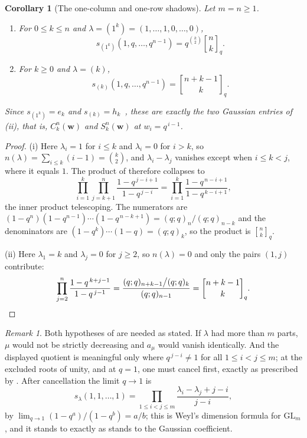 \documentclass[11pt,oneside,openany]{book}
\newtheorem{corollary}[corollary]{Corollary}
\theoremstyle{definition}
\theoremstyle{remark}
\newtheorem{remark}[remark]{Remark}
\newcommand{\qbinom}[2]{\genfrac{[}{]}{0pt}{}{#1}{#2}_{q}}
\begin{document}
\begin{corollary}[The one-column and one-row shadows]\label{cor:schur-e-h}
Let $m=n\ge1$.
\begin{enumerate}[label=\textup{(\roman*)}]
\item For $0\le k\le n$ and $\lambda=(1^k)=(1,\ldots,1,0,\ldots,0)$,
\[
 s_{(1^k)}(1,q,\ldots,q^{n-1})=q^{\binom k2}\qbinom nk.
\]
\item For $k\ge0$ and $\lambda=(k)$,
\[
 s_{(k)}(1,q,\ldots,q^{n-1})=\qbinom{n+k-1}{k}.
\]
\end{enumerate}
Since $s_{(1^k)}=e_k$ and $s_{(k)}=h_k$~\cite{Macdonald1995}, these are
exactly the two Gaussian entries of (ii),
that is, $C_k^n(\mathbf w)$ and $S_k^n(\mathbf w)$ at $w_i=q^{\,i-1}$.
\end{corollary}

\begin{proof}
(i) Here $\lambda_i=1$ for $i\le k$ and $\lambda_i=0$ for $i>k$, so
$n(\lambda)=\sum_{i\le k}(i-1)=\binom k2$, and $\lambda_i-\lambda_j$ vanishes
except when $i\le k<j$, where it equals $1$.  The product of
 therefore collapses to
\[
 \prod_{i=1}^{k}\prod_{j=k+1}^{n}
 \frac{1-q^{\,j-i+1}}{1-q^{\,j-i}}
 =\prod_{i=1}^{k}\frac{1-q^{\,n-i+1}}{1-q^{\,k-i+1}},
\]
the inner product telescoping.  The numerators are
$(1-q^{n})(1-q^{n-1})\cdots(1-q^{\,n-k+1})=(q;q)_n/(q;q)_{n-k}$ and the
denominators are $(1-q^k)\cdots(1-q)=(q;q)_k$, so the product is $\qbinom nk$.

(ii) Here $\lambda_1=k$ and $\lambda_j=0$ for $j\ge2$, so $n(\lambda)=0$ and
only the pairs $(1,j)$ contribute:
\[
 \prod_{j=2}^{n}\frac{1-q^{\,k+j-1}}{1-q^{\,j-1}}
 =\frac{(q;q)_{n+k-1}\big/(q;q)_k}{(q;q)_{n-1}}
 =\qbinom{n+k-1}{k}.
 \qedhere
\]
\end{proof}

\begin{remark}\label{rem:schur-hypotheses}
Both hypotheses of  are needed as stated.  If
$\lambda$ had more than $m$ parts, $\mu$ would not be strictly decreasing and
$a_\mu$ would vanish identically.  And the displayed quotient is meaningful
only where $q^{\,j-i}\ne1$ for all $1\le i<j\le m$; at the excluded roots of
unity, and at $q=1$, one must cancel first, exactly as prescribed by
.  After cancellation the limit $q\to1$ is
\[
 s_\lambda(1,1,\ldots,1)
 =\prod_{1\le i<j\le m}\frac{\lambda_i-\lambda_j+j-i}{j-i},
\]
by $\lim_{q\to1}(1-q^a)/(1-q^b)=a/b$; this is Weyl's dimension formula for
$\mathrm{GL}_m$, and it stands to  exactly as
 stands to the Gaussian coefficient.
\end{remark}
\end{document}
